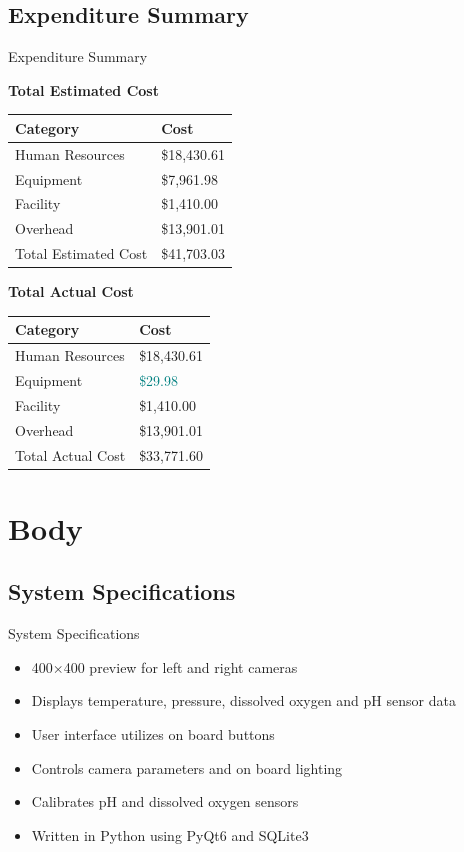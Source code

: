 \documentclass[17pt, aspectratio=169]{beamer}
\begin{document}
\subsection*{Expenditure Summary}
\begin{frame}{Expenditure Summary}
	\begin{center}
		\textbf{Total Estimated Cost}
		\begin{tabular}{||m{}|m{}||}
			\hline
			Category             & Cost        \\
			\hline
			Human Resources      & \$18,430.61 \\
			\hline
			Equipment            & \$7,961.98  \\
			\hline
			Facility             & \$1,410.00  \\
			\hline
			Overhead             & \$13,901.01 \\
			\hline
			Total Estimated Cost & \$41,703.03 \\
			\hline
		\end{tabular}
	\end{center}
\end{frame}
\begin{frame}
	\begin{center}
		\textbf{Total Actual Cost}
		\begin{tabular}{||m{}|m{}||}
			\hline 
			Category & Cost \\
			\hline
			Human Resources & \$18,430.61 \\
			\hline
			Equipment & \textcolor{teal}{\$29.98} \\
			\hline
			Facility & \$1,410.00 \\
			\hline 
			Overhead & \$13,901.01 \\
			\hline
			Total Actual Cost & \$33,771.60 \\
			\hline
		\end{tabular}
	\end{center}
\end{frame}
\section{Body}
\subsection*{System Specifications}
\begin{frame}{System Specifications}
	\begin{itemize}
		\item 400$\times$400 preview for left and right cameras
		\item Displays temperature, pressure, dissolved oxygen and pH sensor data
		\item User interface utilizes on board buttons
		\item Controls camera parameters and on board lighting
		\item Calibrates pH and dissolved oxygen sensors
		\item Written in Python using PyQt6 and SQLite3
	\end{itemize}
\end{frame}
\end{document}
